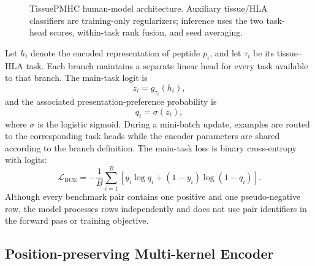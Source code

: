 \begin{figure}[tbp]
\centering
{}
\caption{TissuePMHC human-model architecture. Auxiliary tissue/HLA classifiers are training-only regularizers; inference uses the two task-head scores, within-task rank fusion, and seed averaging.}
\label{fig:tissuepmhc-architecture}
\end{figure}

Let \(h_i\) denote the encoded representation of peptide \(p_i\), and let \(\tau_i\) be its tissue--HLA task. Each branch maintains a separate linear head for every task available to that branch. The main-task logit is
\[
z_i=g_{\tau_i}(h_i),
\]
and the associated presentation-preference probability is
\[
q_i=\sigma(z_i),
\]
where \(\sigma\) is the logistic sigmoid. During a mini-batch update, examples are routed to the corresponding task heads while the encoder parameters are shared according to the branch definition. The main-task loss is binary cross-entropy with logits:
\[
\mathcal{L}_{\mathrm{BCE}}
=
-\frac{1}{B}
\sum_{i=1}^{B}
\left[
y_i\log q_i+(1-y_i)\log(1-q_i)
\right].
\]
Although every benchmark pair contains one positive and one pseudo-negative row, the model processes rows independently and does not use pair identifiers in the forward pass or training objective.

\subsection{Position-preserving Multi-kernel Encoder}

